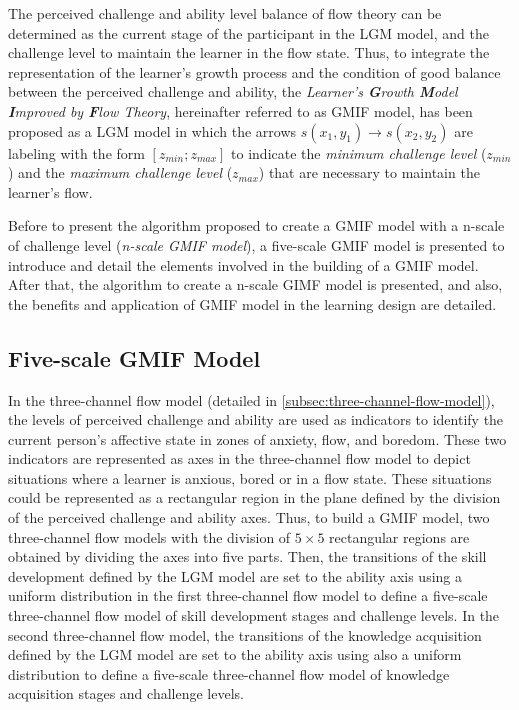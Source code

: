 The perceived challenge and ability level balance of flow theory can be determined as the current stage of the participant in the LGM model, and the challenge level to maintain the learner in the flow state.
Thus, to integrate the representation of the learner’s growth process and the condition of good balance between the perceived challenge and ability, the \emph{Learner’s \textbf{G}rowth \textbf{M}odel \textbf{I}mproved by \textbf{F}low Theory}, hereinafter referred to as GMIF model, has been proposed as a LGM model in which the arrows $s(x_{1},y_{1}) \to s(x_{2},y_{2})$ are labeling with the form $[z_{min}; z_{max}]$ to indicate the \emph{minimum challenge level} ($z_{min}$) and the \emph{maximum challenge level} ($z_{max}$) that are necessary to maintain the learner's flow.

Before to present the algorithm proposed to create a GMIF model with a n-scale of challenge level (\emph{n-scale GMIF model}), a five-scale GMIF model is presented to introduce and detail the elements involved in the building of a GMIF model.
After that, the algorithm to create a n-scale GIMF model is presented, and also, the benefits and application of GMIF model in the learning design are detailed.

\subsection{Five-scale GMIF Model}
\label{subsec:five-scale-gmif-model}

In the three-channel flow model (detailed in \autoref{subsec:three-channel-flow-model}), the levels of perceived challenge and ability are used as indicators to identify the current person's affective state in zones of anxiety, flow, and boredom. 
These two indicators are represented as axes in the three-channel flow model to depict situations where a learner is anxious, bored or in a flow state.
These situations could be represented as a rectangular region in the plane defined by the division of the perceived challenge and ability axes.
Thus, to build a GMIF model, two three-channel flow models with the division of $5 \times 5$ rectangular regions are obtained by dividing the axes into five parts.
Then, the transitions of the skill development defined by the LGM model are set to the ability axis using a uniform distribution in the first three-channel flow model to define a five-scale three-channel flow model of skill development stages and challenge levels.
In the second three-channel flow model, the transitions of the knowledge acquisition defined by the LGM model are set to the ability axis using also a uniform distribution to define a five-scale three-channel flow model of knowledge acquisition stages and challenge levels.

